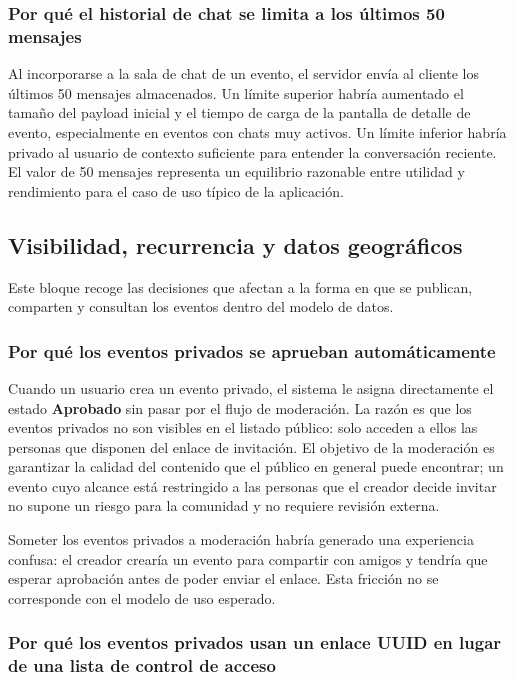 \subsubsection{Por qué el historial de chat se limita a los últimos 50 mensajes}

Al incorporarse a la sala de chat de un evento, el servidor envía al cliente los últimos 50 mensajes almacenados. Un límite superior habría aumentado el tamaño del payload inicial y el tiempo de carga de la pantalla de detalle de evento, especialmente en eventos con chats muy activos. Un límite inferior habría privado al usuario de contexto suficiente para entender la conversación reciente. El valor de 50 mensajes representa un equilibrio razonable entre utilidad y rendimiento para el caso de uso típico de la aplicación.

\subsection{Visibilidad, recurrencia y datos geográficos}

Este bloque recoge las decisiones que afectan a la forma en que se publican, comparten y consultan los eventos dentro del modelo de datos.

\subsubsection{Por qué los eventos privados se aprueban automáticamente}

Cuando un usuario crea un evento privado, el sistema le asigna directamente el estado \textbf{Aprobado} sin pasar por el flujo de moderación. La razón es que los eventos privados no son visibles en el listado público: solo acceden a ellos las personas que disponen del enlace de invitación. El objetivo de la moderación es garantizar la calidad del contenido que el público en general puede encontrar; un evento cuyo alcance está restringido a las personas que el creador decide invitar no supone un riesgo para la comunidad y no requiere revisión externa.

Someter los eventos privados a moderación habría generado una experiencia confusa: el creador crearía un evento para compartir con amigos y tendría que esperar aprobación antes de poder enviar el enlace. Esta fricción no se corresponde con el modelo de uso esperado.

\subsubsection{Por qué los eventos privados usan un enlace UUID en lugar de una lista de control de acceso}

